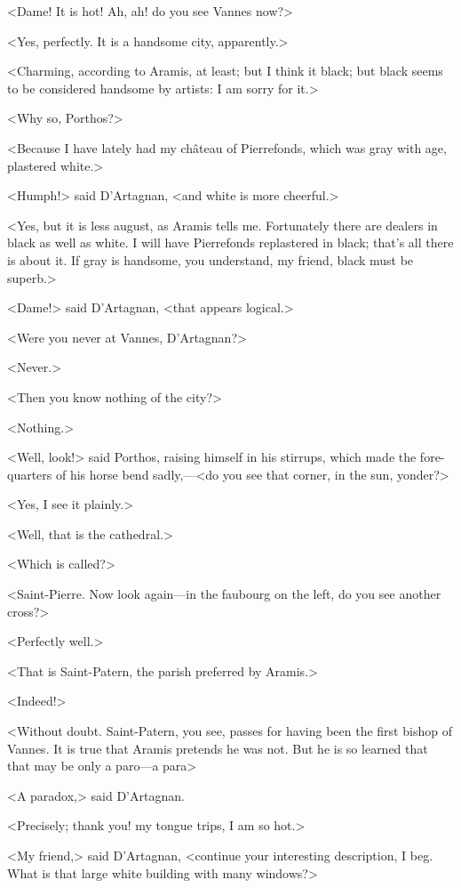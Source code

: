 <Dame! It is hot! Ah, ah! do you see Vannes now?>

<Yes, perfectly. It is a handsome city, apparently.>

<Charming, according to Aramis, at least; but I think it black; but black seems to be considered handsome by artists: I am sorry for it.>

<Why so, Porthos?>

<Because I have lately had my château of Pierrefonds, which was gray with age, plastered white.>

<Humph!> said D'Artagnan, <and white is more cheerful.>

<Yes, but it is less august, as Aramis tells me. Fortunately there are dealers in black as well as white. I will have Pierrefonds replastered in black; that's all there is about it. If gray is handsome, you understand, my friend, black must be superb.>

<Dame!> said D'Artagnan, <that appears logical.>

<Were you never at Vannes, D'Artagnan?>

<Never.>

<Then you know nothing of the city?>

<Nothing.>

<Well, look!> said Porthos, raising himself in his stirrups, which made the fore-quarters of his horse bend sadly,—<do you see that corner, in the sun, yonder?>

<Yes, I see it plainly.>

<Well, that is the cathedral.>

<Which is called?>

<Saint-Pierre. Now look again—in the faubourg on the left, do you see another cross?>

<Perfectly well.>

<That is Saint-Patern, the parish preferred by Aramis.>

<Indeed!>

<Without doubt. Saint-Patern, you see, passes for having been the first bishop of Vannes. It is true that Aramis pretends he was not. But he is so learned that that may be only a paro—a para\longdash>

<A paradox,> said D'Artagnan.

<Precisely; thank you! my tongue trips, I am so hot.>

<My friend,> said D'Artagnan, <continue your interesting description, I beg. What is that large white building with many windows?>

